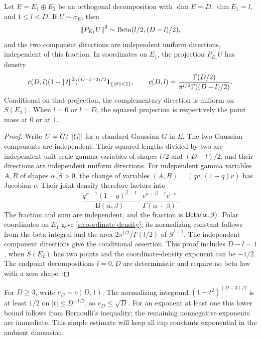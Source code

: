 \begin{lemma}\label{s:coordinates}
Let \(E=E_1\oplus E_2\) be an orthogonal decomposition with
\(\dim E=D\), \(\dim E_1=l\), and \(1\le l<D\). If
\(U\sim\sigma_E\), then
\[
 \left\lVert P_{E_1}U\right\rVert^2\sim\operatorname{Beta}(l/2,(D-l)/2),
\]
and the two component directions are independent uniform directions,
independent of this fraction. In coordinates on \(E_1\), the
projection \(P_{E_1}U\) has density
\begin{equation}\label{s:coordinate-density}
 c(D,l)(1-\left\lVert t\right\rVert^2)^{(D-l-2)/2}\mathbf 1_{\{\left\lVert t\right\rVert<1\}},
 \qquad
 c(D,l)=\frac{\Gamma(D/2)}
              {\pi^{l/2}\Gamma((D-l)/2)}.
\end{equation}
Conditional on that projection, the complementary direction is
uniform on \(S(E_2)\). When \(l=0\) or \(l=D\), the squared
projection is respectively the point mass at \(0\) or at \(1\).
\end{lemma}
\begin{proof}
Write \(U=G/\left\lVert G\right\rVert\) for a standard Gaussian \(G\) in \(E\).
The two Gaussian components are independent. Their squared lengths
divided by two are independent unit-scale gamma variables of shapes
\(l/2\) and \((D-l)/2\), and their directions are independent
uniform directions. For independent gamma variables \(A,B\) of
shapes \(\alpha,\beta>0\), the change of variables
\((A,B)=(qv,(1-q)v)\) has Jacobian \(v\). Their joint density therefore
factors into
\[
 \frac{q^{\alpha-1}(1-q)^{\beta-1}}{\mathrm B(\alpha,\beta)}
 \cdot
 \frac{v^{\alpha+\beta-1}e^{-v}}{\Gamma(\alpha+\beta)}.
\]
The fraction and sum are independent, and the fraction is
\(\operatorname{Beta}(\alpha,\beta)\). Polar coordinates on \(E_1\) give
\eqref{s:coordinate-density}; its normalizing constant follows from
the beta integral and the area
\(2\pi^{l/2}/\Gamma(l/2)\) of \(S^{l-1}\).
The independent component directions give the conditional assertion.
This proof includes \(D-l=1\), when \(S(E_2)\) has two points and the
coordinate-density exponent can be \(-1/2\). The endpoint
decompositions \(l=0,D\) are deterministic and require no beta law
with a zero shape.
\end{proof}

For \(D\ge3\), write \(c_D=c(D,1)\). The normalizing integrand
\((1-t^2)^{(D-3)/2}\) is at least \(1/2\) on
\(|t|\le D^{-1/2}\), so \(c_D\le\sqrt D\). For an exponent at least
one this lower bound follows from Bernoulli's inequality; the remaining
nonnegative exponents are immediate. This simple estimate will keep
all cap constants exponential in the ambient dimension.

